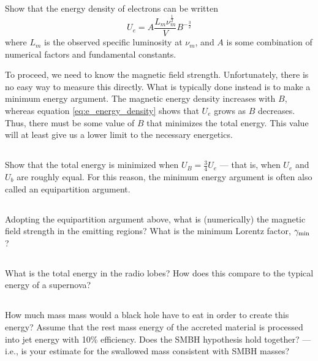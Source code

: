 \documentclass[11pt]{article}
\begin{document}
\subsection{}
Show that the energy density of electrons can be written
\begin{equation}
U_e=A\frac{L_m\nu_m^\frac12}{V}B^{-\frac32}
\label{eq:e_energy_density}
\end{equation}
where $L_m$ is the observed specific luminosity at $\nu_m$, and $A$ is some
combination of numerical factors and fundamental constants.

To proceed, we need to know the magnetic field strength. Unfortunately, there
is no easy way to measure this directly. What is typically done instead is to
make a minimum energy argument. The magnetic energy density increases with $B$,
whereas equation \ref{eq:e_energy_density} shows that $U_e$ grows as $B$ decreases. 
Thus, there must be some
value of $B$ that minimizes the total energy. This value will at least
give us a lower limit to the necessary energetics.

\subsection{}

Show that the total energy is minimized when $U_B=\frac34 U_e$ --- that is, when $U_e$ and
$U_b$ are roughly equal. For this reason, the minimum energy argument is often
also called an equipartition argument.

\subsection{}
Adopting the equipartition argument above, what is (numerically) the magnetic
field strength in the emitting regions? What is the minimum Lorentz factor,
$\gamma_{\rm min}$?

\subsection{}
What is the total energy in the radio lobes? How does this compare to the typical energy of a supernova?

\subsection{}
How much mass mass would a black hole have to eat in order to create this
energy? Assume that the rest mass energy of the accreted material is
processed into jet energy with 10\% efficiency. Does the SMBH hypothesis hold
together? --- i.e., is your estimate for the swallowed mass consistent with SMBH
masses?
\end{document}

